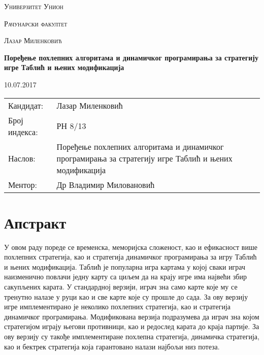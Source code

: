 \documentclass[a4paper, 12pt]{report}
\begin{document}
\begin{titlepage}
	\centering
	{\scshape\Large Универзитет Унион \par}
	\vspace{1cm}
	{\scshape\LARGE Рачунарски факултет\par}
	\vspace{2cm}
	{\scshape\large Лазар Миленковић\par}
	\vspace{0.5cm}
	{\huge\bfseries Поређење похлепних алгоритама и динамичког програмирања за  стратегију игре Таблић и њених модификација \par}
	\vspace{2cm}
	\vfill

	
	{\large 10.07.2017\par}
\end{titlepage}
\pagebreak

\begin{tabularx}{\textwidth}{lX}
	Кандидат: & Лазар Миленковић  \\
	Број индекса: & РН 8/13 \\
	Наслов: & Поређење похлепних алгоритама и динамичког програмирања за  стратегију игре Таблић и њених модификација \\
	Ментор: & Др Владимир Миловановић\\
\end{tabularx}
\pagebreak
\section{Апстракт}
У овом раду пореде се временска, меморијска сложеност, као и ефикасност више похлепних стратегија, као и стратегија динамичког програмирања за игру Таблић и њених модификација. Таблић је популарна игра картама у којој сваки играч наизменично повлачи једну карту са циљем да на крају игре има највећи збир сакупљених карата. У стандардној верзији, играч зна само карте које му се тренутно налазе у руци као и све карте које су прошле до сада. За ову верзију игре имплементирано је неколико похлепних стратегија, као и стратегија динамичког програмирања. Модификована верзија подразумева да играч зна којом стратегијом играју његови противници, као и редослед карата до краја партије. За ову верзију су такође имплементиране похлепна стратегија, динамичка стратегија, као и бектрек стратегија која гарантовано налази најбољи низ потеза. 
\end{document}
